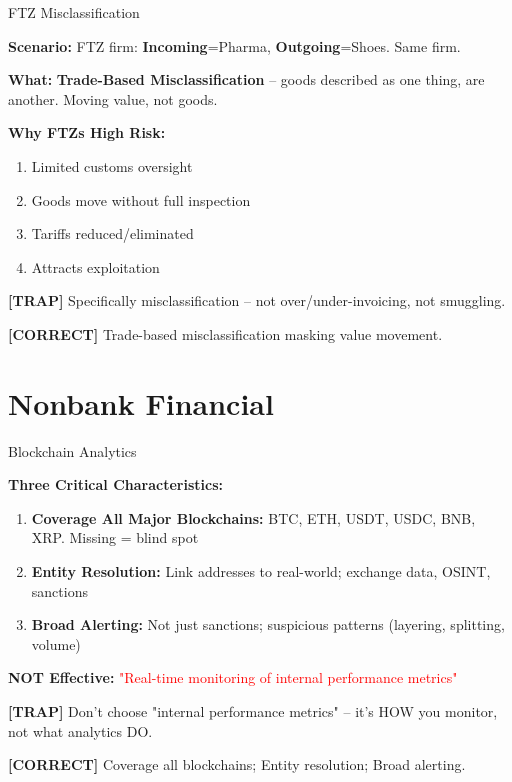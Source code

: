 \documentclass[8pt,aspectratio=169,fontsize=7pt]{beamer}
\renewcommand{\tiny}{\fontsize{4pt}{5pt}\selectfont}
\renewcommand{\normalsize}{\fontsize{8pt}{9pt}\selectfont}
\newcommand{\trap}[1]{%
	\begin{block}{\textcolor{redtrap}{\textbf{[TRAP]}}}
		\textcolor{redtrap}{\tiny #1}
	\end{block}
}
\newcommand{\correct}[1]{%
	\begin{block}{\textcolor{greencorrect}{\textbf{[CORRECT]}}}
		\textcolor{greencorrect}{\tiny #1}
	\end{block}
}
\begin{document}
	\begin{frame}{\normalsize FTZ Misclassification}
		
		\textbf{Scenario:} FTZ firm: \textbf{Incoming}=Pharma, \textbf{Outgoing}=Shoes. Same firm.
		
		\textbf{What:} \textbf{Trade-Based Misclassification} -- goods described as one thing, are another. Moving value, not goods.
		
		\textbf{Why FTZs High Risk:}
		\begin{enumerate}
			\item Limited customs oversight
			\item Goods move without full inspection
			\item Tariffs reduced/eliminated
			\item Attracts exploitation
		\end{enumerate}
		
		\trap{Specifically misclassification -- not over/under-invoicing, not smuggling.}
		
		\correct{Trade-based misclassification masking value movement.}
	\end{frame}
	
	\section{Nonbank Financial}
	
	\begin{frame}{\normalsize Blockchain Analytics}
		
		\textbf{Three Critical Characteristics:}
		\begin{enumerate}
			\item \textbf{Coverage All Major Blockchains:} BTC, ETH, USDT, USDC, BNB, XRP. Missing = blind spot
			\item \textbf{Entity Resolution:} Link addresses to real-world; exchange data, OSINT, sanctions
			\item \textbf{Broad Alerting:} Not just sanctions; suspicious patterns (layering, splitting, volume)
		\end{enumerate}
		
		\textbf{NOT Effective:} \textcolor{red}{"Real-time monitoring of internal performance metrics"}
		
		\trap{Don't choose "internal performance metrics" -- it's HOW you monitor, not what analytics DO.}
		
		\correct{Coverage all blockchains; Entity resolution; Broad alerting.}
	\end{frame}
	
\end{document}
